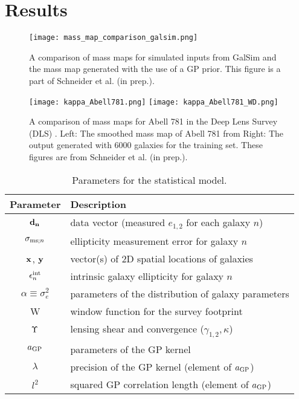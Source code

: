 \section{Results}
 \begin{figure}
	\centering
	\texttt{[image: mass\_map\_comparison\_galsim.png]}
	\caption{A comparison of mass maps for simulated inputs from {\sc GalSim} and
	the mass map generated with the use of a GP prior. 
	This figure is a part of Schneider et al. (in prep.).  \label{fig:Galsim_massmaps}
}
\end{figure}

\begin{figure}
	\centering
	\texttt{[image: kappa\_Abell781.png]}
	\texttt{[image: kappa\_Abell781\_WD.png]}
	\caption{A comparison of mass maps for Abell 781 in the Deep Lens Survey (DLS) 
		\label{fig:Abell781_massmap}.  Left: The smoothed mass map of Abell 781 from 
		Right: The output generated with 6000 galaxies for the training set. 
	These figures are from Schneider et al. (in prep.).
}
\end{figure}



\begin{table}%
\begin{center}
\caption{Parameters for the statistical model.}
\label{tab:sampling_parameters}
\begin{tabular}{cl}
\hline
Parameter & Description \\
\hline
${\bf d_{n}}$ & data vector (measured $e_{1,2}$ for each galaxy $n$)  \\
$\sigma_{{\rm ms}; n}$ & ellipticity measurement error for galaxy $n$ 
\\
$\mathbf{x}$, $\mathbf{y}$ & vector(s) of 2D spatial locations of galaxies \\
$\epsilon_n^{\rm int}$ & intrinsic galaxy ellipticity for galaxy $n$ \\
$\alpha\equiv\sigma_{e}^2$ & parameters of the distribution of galaxy parameters \\
W & window function for the survey footprint \\
$\Upsilon$ & lensing shear and convergence ($\gamma_{1,2}, \kappa$) \\
$a_{\rm GP}$ & parameters of the GP kernel\\
$\lambda$ & precision of the GP kernel (element of $a_{\rm GP}$) \\
$l^2$ & squared GP correlation length (element of $a_{\rm GP}$) \\
\hline
\end{tabular}
\end{center}
\end{table}



